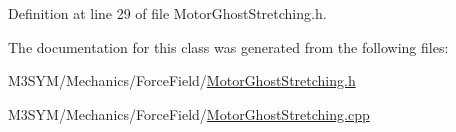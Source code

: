 Definition at line 29 of file Motor\+Ghost\+Stretching.\+h.



The documentation for this class was generated from the following files\+:\begin{DoxyCompactItemize}
\item 
M3\+S\+Y\+M/\+Mechanics/\+Force\+Field/\hyperlink{MotorGhostStretching_8h}{Motor\+Ghost\+Stretching.\+h}\item 
M3\+S\+Y\+M/\+Mechanics/\+Force\+Field/\hyperlink{MotorGhostStretching_8cpp}{Motor\+Ghost\+Stretching.\+cpp}\end{DoxyCompactItemize}
